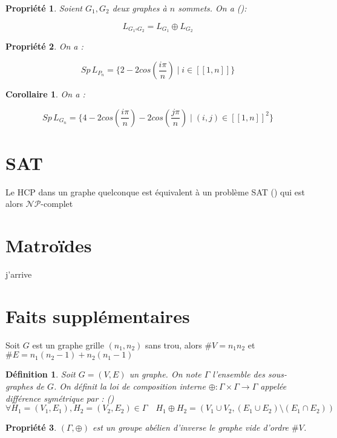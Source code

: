 \documentclass[french,a4paper]{article}
\newtheorem{definition}{Définition}[section]
\newtheorem{property}{Propriété}[section]
\newtheorem{corollary}{Corollaire}[section]
\begin{document}
\begin{property}
Soient $G_1,G_2$ deux graphes à $n$ sommets. On a (\cite{Barik2015ONTL}):

\[
L_{G_1 \square G_2}=L_{G_1} \oplus L_{G_2}
\]
\end{property}

\begin{property}
On a :

\[
Sp \, L_{P_n} = \{2-2cos(\frac{i\pi}{n}) \mid i \in [\![1,n]\!] \}
\]
\end{property}

\begin{corollary}
On a :

\[
Sp \, L_{G_n} = \{4-2cos(\frac{i\pi}{n})-2cos(\frac{j\pi}{n}) \mid (i,j) \in [\![1,n]\!]^2 \}
\]
\end{corollary}

\section{SAT}
Le HCP dans un graphe quelconque est équivalent à un problème SAT (\cite{Plotnikov2001ALM}) qui est alors $\mathcal{NP}$-complet

\section{Matroïdes}
j'arrive

\section{Faits supplémentaires}

Soit $G$ est un graphe grille $(n_{1},n_{2})$ sans trou, alors $\#V=n_{1}n_{2}$ et $\#E=n_1(n_2-1)+n_2(n_1-1)$



\begin{definition}
Soit $G=(V,E)$ un graphe. On note $\Gamma$ l'ensemble des sous-graphes de $G$.
On définit la loi de composition interne $\oplus : \Gamma \times \Gamma \to \Gamma$ appelée différence symétrique par : (\cite{Umans1996AnAF})
$$\forall H_1=(V_1,E_1),H_2=(V_2,E_2) \in \Gamma \quad H_1 \oplus H_2 = (V_1 \cup V_2,(E_1 \cup E_2) \setminus (E_1 \cap E_2))$$
\end{definition}

\begin{property}
$(\Gamma,\oplus)$ est un groupe abélien d'inverse le graphe vide d'ordre $\#V$.
\end{property}
\end{document}
